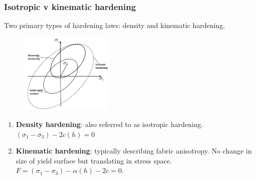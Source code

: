 \documentclass[notes]{beamer}
\begin{document}
\begin{frame}
\frametitle{Isotropic v kinematic hardening}
Two primary types of hardening laws: density and kinematic hardening.
\begin{figure}
	\includegraphics[width=0.4\textwidth]{figs/isotropic-kinematic-hardening.png}
\end{figure}
\begin{enumerate}
	\item \textbf{Density hardening}: also referred to as isotropic hardening. $(\sigma_1 - \sigma_3) - 2c(h) = 0$
	\item \textbf{Kinematic hardening}: typically describing fabric anisotropy. No change in size of yield surface but translating in stress space. $F = (\sigma_1 - \sigma_3) - \alpha(h) - 2c = 0$.
\end{enumerate}
\end{frame}

\end{document}

